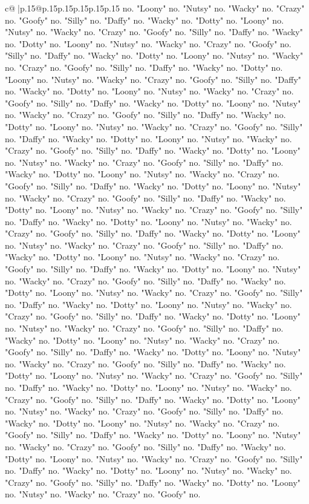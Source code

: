 \documentclass{article}
\begin{document}
{\begin{supertabular}{c@{$\;$}|p{.15\linewidth}@{}p{.15\linewidth}p{.15\linewidth}p{.15\linewidth}p{.15\linewidth}p{.15\linewidth}}
{{{no. "Loony" no. "Nutsy" no. "Wacky" no. "Crazy" no. "Goofy" no. "Silly" no. "Daffy" no. "Wacky" no. "Dotty" no. "Loony" no. "Nutsy" no. "Wacky" no. "Crazy" no. "Goofy" no. "Silly" no. "Daffy" no. "Wacky" no. "Dotty" no. "Loony" no. "Nutsy" no. "Wacky" no. "Crazy" no. "Goofy" no. "Silly" no. "Daffy" no. "Wacky" no. "Dotty" no. "Loony" no. "Nutsy" no. "Wacky" no. "Crazy" no. "Goofy" no. "Silly" no. "Daffy" no. "Wacky" no. "Dotty" no. "Loony" no. "Nutsy" no. "Wacky" no. "Crazy" no. "Goofy" no. "Silly" no. "Daffy" no. "Wacky" no. "Dotty" no. "Loony" no. "Nutsy" no. "Wacky" no. "Crazy" no. "Goofy" no. "Silly" no. "Daffy" no. "Wacky" no. "Dotty" no. "Loony" no. "Nutsy" no. "Wacky" no. "Crazy" no. "Goofy" no. "Silly" no. "Daffy" no. "Wacky" no. "Dotty" no. "Loony" no. "Nutsy" no. "Wacky" no. "Crazy" no. "Goofy" no. "Silly" no. "Daffy" no. "Wacky" no. "Dotty" no. "Loony" no. "Nutsy" no. "Wacky" no. "Crazy" no. "Goofy" no. "Silly" no. "Daffy" no. "Wacky" no. "Dotty" no. "Loony" no. "Nutsy" no. "Wacky" no. "Crazy" no. "Goofy" no. "Silly" no. "Daffy" no. "Wacky" no. "Dotty" no. "Loony" no. "Nutsy" no. "Wacky" no. "Crazy" no. "Goofy" no. "Silly" no. "Daffy" no. "Wacky" no. "Dotty" no. "Loony" no. "Nutsy" no. "Wacky" no. "Crazy" no. "Goofy" no. "Silly" no. "Daffy" no. "Wacky" no. "Dotty" no. "Loony" no. "Nutsy" no. "Wacky" no. "Crazy" no. "Goofy" no. "Silly" no. "Daffy" no. "Wacky" no. "Dotty" no. "Loony" no. "Nutsy" no. "Wacky" no. "Crazy" no. "Goofy" no. "Silly" no. "Daffy" no. "Wacky" no. "Dotty" no. "Loony" no. "Nutsy" no. "Wacky" no. "Crazy" no. "Goofy" no. "Silly" no. "Daffy" no. "Wacky" no. "Dotty" no. "Loony" no. "Nutsy" no. "Wacky" no. "Crazy" no. "Goofy" no. "Silly" no. "Daffy" no. "Wacky" no. "Dotty" no. "Loony" no. "Nutsy" no. "Wacky" no. "Crazy" no. "Goofy" no. "Silly" no. "Daffy" no. "Wacky" no. "Dotty" no. "Loony" no. "Nutsy" no. "Wacky" no. "Crazy" no. "Goofy" no. "Silly" no. "Daffy" no. "Wacky" no. "Dotty" no. "Loony" no. "Nutsy" no. "Wacky" no. "Crazy" no. "Goofy" no. "Silly" no. "Daffy" no. "Wacky" no. "Dotty" no. "Loony" no. "Nutsy" no. "Wacky" no. "Crazy" no. "Goofy" no. "Silly" no. "Daffy" no. "Wacky" no. "Dotty" no. "Loony" no. "Nutsy" no. "Wacky" no. "Crazy" no. "Goofy" no. "Silly" no. "Daffy" no. "Wacky" no. "Dotty" no. "Loony" no. "Nutsy" no. "Wacky" no. "Crazy" no. "Goofy" no. "Silly" no. "Daffy" no. "Wacky" no. "Dotty" no. "Loony" no. "Nutsy" no. "Wacky" no. "Crazy" no. "Goofy" no. "Silly" no. "Daffy" no. "Wacky" no. "Dotty" no. "Loony" no. "Nutsy" no. "Wacky" no. "Crazy" no. "Goofy" no. "Silly" no. "Daffy" no. "Wacky" no. "Dotty" no. "Loony" no. "Nutsy" no. "Wacky" no. "Crazy" no. "Goofy" no. "Silly" no. "Daffy" no. "Wacky" no. "Dotty" no. "Loony" no. "Nutsy" no. "Wacky" no. "Crazy" no. "Goofy" no. "Silly" no. "Daffy" no. "Wacky" no. "Dotty" no. "Loony" no. "Nutsy" no. "Wacky" no. "Crazy" no. "Goofy" no. "Silly" no. "Daffy" no. "Wacky" no. "Dotty" no. "Loony" no. "Nutsy" no. "Wacky" no. "Crazy" no. "Goofy" no. "Silly" no. "Daffy" no. "Wacky" no. "Dotty" no. "Loony" no. "Nutsy" no. "Wacky" no. "Crazy" no. "Goofy" no. "Silly" no. "Daffy" no. "Wacky" no. "Dotty" no. "Loony" no. "Nutsy" no. "Wacky" no. "Crazy" no. "Goofy" no. }}}
\end{supertabular}}
\end{document}
